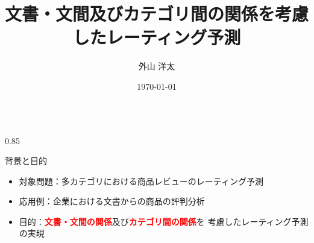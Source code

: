 \documentclass[unicode,10pt]{beamer}
\title{文書・文間及びカテゴリ間の関係を考慮したレーティング予測}
\institute{豊田工業大学 知能数理研究室}
\author{外山 洋太}
\date{\today}
\newlength{\mycolumnwidth}
\newcommand{\fire}[1]{\textcolor{red}{\textbf{#1}}}
\begin{document}
\begin{frame}[t]
\vspace{-1em} %
\begin{columns}[onlytextwidth,t]

\begin{column}{0.85\mycolumnwidth}
  \begin{block}{背景と目的}
    \begin{itemize}
      \item 対象問題：多カテゴリにおける商品レビューのレーティング予測
      \item 応用例：企業における文書からの商品の評判分析
      \item 目的：\fire{文書・文間の関係}及び\fire{カテゴリ間の関係}を
                  考慮したレーティング予測の実現
    \end{itemize}
  \end{block}


\end{column}
\end{columns}
\end{frame}
\end{document}

